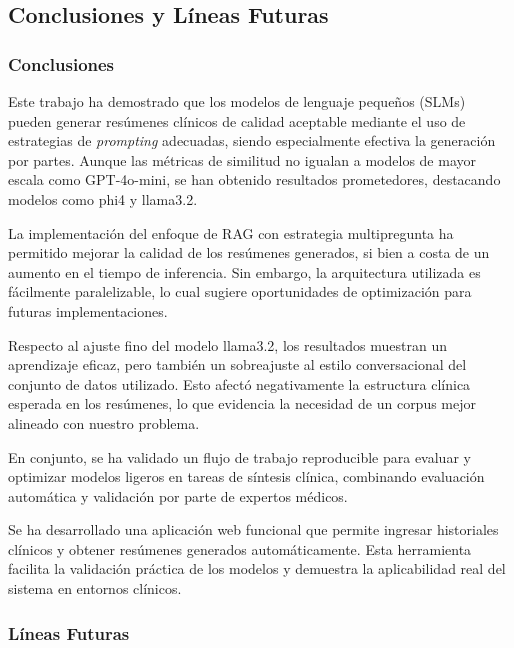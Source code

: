 \documentclass[../main.tex]{subfiles}
\begin{document}
\subsection{Conclusiones y Líneas Futuras}

\subsubsection{Conclusiones}

Este trabajo ha demostrado que los modelos de lenguaje pequeños (SLMs) pueden generar resúmenes clínicos de calidad aceptable mediante el uso de estrategias de \textit{prompting} adecuadas, siendo especialmente efectiva la generación por partes. Aunque las métricas de similitud no igualan a modelos de mayor escala como GPT-4o-mini, se han obtenido resultados prometedores, destacando modelos como phi4 y llama3.2.

La implementación del enfoque de RAG con estrategia multipregunta ha permitido mejorar la calidad de los resúmenes generados, si bien a costa de un aumento en el tiempo de inferencia. Sin embargo, la arquitectura utilizada es fácilmente paralelizable, lo cual sugiere oportunidades de optimización para futuras implementaciones.

Respecto al ajuste fino  del modelo llama3.2, los resultados muestran un aprendizaje eficaz, pero también un sobreajuste al estilo conversacional del conjunto de datos utilizado. Esto afectó negativamente la estructura clínica esperada en los resúmenes, lo que evidencia la necesidad de un corpus mejor alineado con nuestro problema.

En conjunto, se ha validado un flujo de trabajo reproducible para evaluar y optimizar modelos ligeros en tareas de síntesis clínica, combinando evaluación automática y validación por parte de expertos médicos.

Se ha desarrollado una aplicación web funcional que permite ingresar historiales clínicos y obtener resúmenes generados automáticamente. Esta herramienta facilita la validación práctica de los modelos y demuestra la aplicabilidad real del sistema en entornos clínicos.

\subsubsection{Líneas Futuras}
\end{document}
